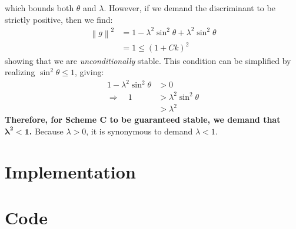 \documentclass{math_hw}
\theoremstyle{definition}
\begin{document}
    which bounds both $\theta$ and $\lambda$.
    However, if we demand the discriminant to be strictly positive, then we find:
    \begin{equation*}
        \begin{split}
            \left\| g \right\|^2 &= 1 - \lambda^2 \sin^2 \theta +\lambda^2 \sin^2 \theta\\
            &= 1 \leq \left( 1+Ck \right)^2
        \end{split}
    \end{equation*}
    showing that we are \textit{unconditionally} stable.
    This condition can be simplified by realizing $\sin^2\theta \leq 1$, giving:
    \begin{equation*}
        \begin{split}
            1-\lambda^2\sin^2 \theta &>0\\
            \Rightarrow \quad  1&>\lambda^2 \sin^2 \theta \\
            &> \lambda ^2
        \end{split}
    \end{equation*}
    \textbf{Therefore, for Scheme C to be guaranteed stable, we demand that $\boldsymbol{{\lambda}^2<1}$.}
    Because $\lambda > 0$, it is synonymous to demand $\lambda <1$.


    \section{Implementation}
    
    
    \appendix
    \section{Code}
    \inputminted{python}{578_HW1.py}
\end{document}
